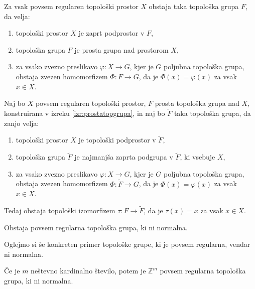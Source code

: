 \documentclass[mat1]{fmfdelo}
\newcommand{\Z}{\mathbb Z}
\begin{document}
\begin{izrek}\label{izr:prostatopgrupa}
Za vsak povsem regularen topološki prostor $X$ obstaja taka topološka grupa $F$, da velja:
\begin{enumerate}
	\item topološki prostor $X$ je zaprt podprostor v $F$,
	\item topološka grupa $F$ je prosta grupa nad prostorom $X$,
	\item za vsako zvezno preslikavo $\varphi\colon X \to G$, kjer je $G$ poljubna topološka grupa, obstaja zvezen homomorfizem $\Phi\colon F \to G$, da je $\Phi(x) = \varphi(x)$ za vsak $x \in X$.
\end{enumerate}
\end{izrek}

\begin{izrek}\label{izr:prostaizo}
Naj bo $X$ povsem regularen topološki prostor, $F$ prosta topološka grupa nad $X$, konstruirana v izreku \ref{izr:prostatopgrupa}, in naj bo $\widetilde{F}$ taka topološka grupa, da zanjo velja:
\begin{enumerate}
	\item topološki prostor $X$ je topološki podprostor v $\widetilde{F}$,
	\item topološka grupa $\widetilde{F}$ je najmanjša zaprta podgrupa v $\widetilde{F}$, ki vsebuje $X$,
	\item za vsako zvezno preslikavo $\varphi\colon X \to G$, kjer je $G$ poljubna topološka grupa, obstaja zvezen homomorfizem $\Phi\colon \widetilde{F} \to G$, da je $\Phi(x) = \varphi(x)$ za vsak $x \in X$.
\end{enumerate}
Tedaj obstaja topološki izomorfizem $\tau\colon F \to \widetilde{F}$, da je $\tau(x) = x$ za vsak $x \in X$.
\end{izrek}

\begin{izrek}
Obstaja povsem regularna topološka grupa, ki ni normalna.
\end{izrek}

Oglejmo si še konkreten primer topološke grupe, ki je povsem regularna, vendar ni normalna.

\begin{izrek}\label{izr:t4protiprimer}
	Če je $m$ neštevno kardinalno število, potem je $\Z^{m}$ povsem regularna topološka grupa, ki ni normalna.
\end{izrek}
\end{document}
